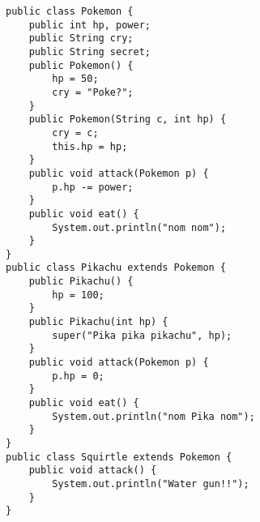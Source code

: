 \begin{lstlisting}
public class Pokemon {
    public int hp, power;
    public String cry;
    public String secret;
    public Pokemon() {
        hp = 50;
        cry = "Poke?";
    }
    public Pokemon(String c, int hp) {
        cry = c;
        this.hp = hp;
    }
    public void attack(Pokemon p) {
        p.hp -= power;
    }
    public void eat() {
        System.out.println("nom nom");
    }
}
public class Pikachu extends Pokemon {
    public Pikachu() {
        hp = 100;
    }
    public Pikachu(int hp) {
        super("Pika pika pikachu", hp);
    }
    public void attack(Pokemon p) {
        p.hp = 0;
    }
    public void eat() {
        System.out.println("nom Pika nom");
    }
}
public class Squirtle extends Pokemon {
    public void attack() {
        System.out.println("Water gun!!");
    }
}
\end{lstlisting}
